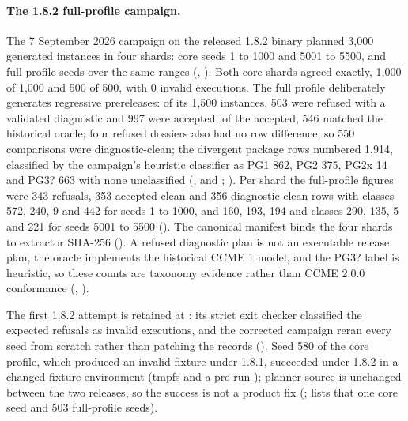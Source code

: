 \paragraph{The 1.8.2 full-profile campaign.}
The 7 September 2026 campaign on the released 1.8.2 binary planned 3,000
generated instances in four shards: core seeds 1 to 1000 and 5001 to 5500, and
full-profile seeds over the same ranges
(, ). Both core
shards agreed exactly, 1,000 of 1,000 and 500 of 500, with 0 invalid
executions. The full profile deliberately generates regressive prereleases:
of its 1,500 instances, 503 were refused with a validated 
diagnostic and 997 were accepted; of the accepted, 546 matched the historical
oracle; four refused dossiers also had no row difference, so 550 comparisons
were diagnostic-clean; the divergent package rows numbered 1,914, classified
by the campaign's heuristic classifier as PG1 862, PG2 375, PG2x 14 and PG3?
663 with none unclassified (,
 and ;
). Per shard the
full-profile figures were 343 refusals, 353 accepted-clean and 356
diagnostic-clean rows with classes 572, 240, 9 and 442 for seeds 1 to 1000,
and 160, 193, 194 and classes 290, 135, 5 and 221 for seeds 5001 to 5500
(). The canonical manifest binds the four shards to extractor
SHA-256 
(). A
refused diagnostic plan is not an executable release plan, the oracle
implements the historical CCME 1 model, and the PG3? label is heuristic, so
these counts are taxonomy evidence rather than CCME 2.0.0 conformance
(, ).

The first 1.8.2 attempt is retained at
: its strict exit checker
classified the expected  refusals as invalid executions, and the
corrected campaign reran every seed from scratch rather than patching the
records (). Seed 580 of
the core profile, which produced an invalid fixture under 1.8.1, succeeded
under 1.8.2 in a changed fixture environment (tmpfs and a pre-run ); planner source is unchanged between the two releases, so the success
is not a product fix (; 
lists that one core seed and 503 full-profile seeds).

